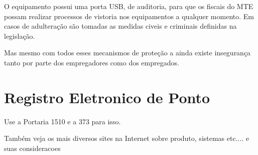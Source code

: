 \documentclass[12pt,openright,twoside,a4paper,english, brazil]{abntex2} %
\begin{document}
O equipamento possui uma porta USB, de auditoria, para que os fiscais do MTE possam realizar processos de vistoria nos equipamentos a qualquer momento. Em casos de adulteração são tomadas as medidas civeis e criminais definidas na legislação. 

Mas mesmo com todos esses mecanismos de proteção a ainda existe insegurança tanto por parte dos empregadores como dos empregados.















\chapter{Registro Eletronico de Ponto}

Use a Portaria 1510 e a 373 para isso. 

Também veja os mais diversos sites na Internet sobre produto, sistemas etc.... e suas consideracoes
\end{document}
